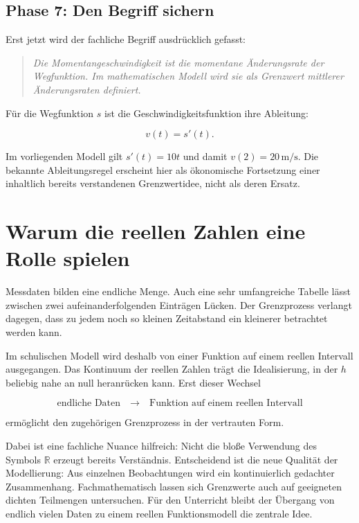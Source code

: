 \documentclass[11pt,a4paper]{article}
\newenvironment{leitgedanke}
  {\begin{quote}\color{dunkelblau}\itshape}
  {\end{quote}}
\begin{document}
\subsection{Phase 7: Den Begriff sichern}

Erst jetzt wird der fachliche Begriff ausdrücklich gefasst:

\begin{leitgedanke}
Die Momentangeschwindigkeit ist die momentane Änderungsrate der Wegfunktion. Im
mathematischen Modell wird sie als Grenzwert mittlerer Änderungsraten definiert.
\end{leitgedanke}

Für die Wegfunktion $s$ ist die Geschwindigkeitsfunktion ihre Ableitung:

\[
  v(t)=s'(t).
\]

Im vorliegenden Modell gilt $s'(t)=10t$ und damit $v(2)=20\,\mathrm{m/s}$.
Die bekannte Ableitungsregel erscheint hier als ökonomische Fortsetzung einer
inhaltlich bereits verstandenen Grenzwertidee, nicht als deren Ersatz.


\section{Warum die reellen Zahlen eine Rolle spielen}

Messdaten bilden eine endliche Menge. Auch eine sehr umfangreiche Tabelle lässt
zwischen zwei aufeinanderfolgenden Einträgen Lücken. Der Grenzprozess verlangt
dagegen, dass zu jedem noch so kleinen Zeitabstand ein kleinerer betrachtet
werden kann.

Im schulischen Modell wird deshalb von einer Funktion auf einem reellen
Intervall ausgegangen. Das Kontinuum der reellen Zahlen trägt die Idealisierung,
in der $h$ beliebig nahe an null heranrücken kann. Erst dieser Wechsel

\[
  \text{endliche Daten}
  \quad\longrightarrow\quad
  \text{Funktion auf einem reellen Intervall}
\]

ermöglicht den zugehörigen Grenzprozess in der vertrauten Form.

Dabei ist eine fachliche Nuance hilfreich: Nicht die bloße Verwendung des
Symbols $\mathbb{R}$ erzeugt bereits Verständnis. Entscheidend ist die neue
Qualität der Modellierung: Aus einzelnen Beobachtungen wird ein kontinuierlich
gedachter Zusammenhang. Fachmathematisch lassen sich Grenzwerte auch auf
geeigneten dichten Teilmengen untersuchen. Für den Unterricht bleibt der
Übergang von endlich vielen Daten zu einem reellen Funktionsmodell die zentrale
Idee.
\end{document}
